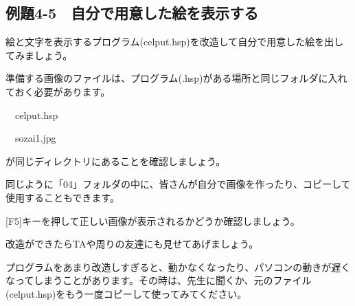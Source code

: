 \newpage
\subsection{例題4-5　自分で用意した絵を表示する}

\begin{description}
    \item {}
\end{description}


絵と文字を表示するプログラム(celput.hsp)を改造して自分で用意した絵を出してみましょう。

準備する画像のファイルは、プログラム(.hsp)がある場所と同じフォルダに入れておく必要があります。

\ \ celput.hsp

\ \ sozai1.jpg

が同じディレクトリにあることを確認しましょう。

同じように「04」フォルダの中に、皆さんが自分で画像を作ったり、コピーして使用することもできます。

\begin{description}
    \item {}
\end{description}


[F5]キーを押して正しい画像が表示されるかどうか確認しましょう。

改造ができたらTAや周りの友達にも見せてあげましょう。

プログラムをあまり改造しすぎると、動かなくなったり、パソコンの動きが遅くなってしまうことがあります。その時は、先生に聞くか、元のファイル(celput.hsp)をもう一度コピーして使ってみてください。








